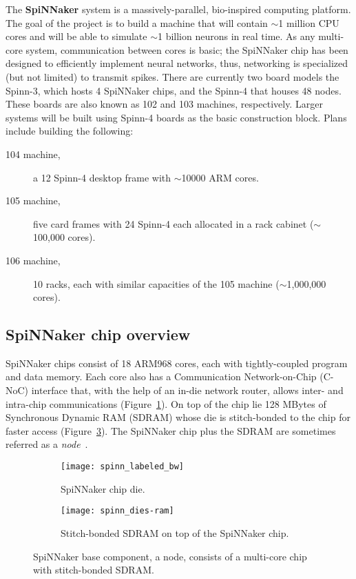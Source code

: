 The \textbf{SpiNNaker} system is a massively-parallel, bio-inspired computing platform. The goal of the project is to build a machine that will contain $\sim$1 million CPU cores and will be able to simulate $\sim$1 billion neurons in real time. As any multi-core system, communication between cores is basic; the SpiNNaker chip has been designed to efficiently implement neural networks, thus, networking is specialized (but not limited) to transmit spikes. There are currently two board models the Spinn-3, which hosts 4 SpiNNaker chips, and the Spinn-4 that houses 48 nodes. These boards are also known as 102 and 103 machines, respectively. Larger systems will be built using Spinn-4 boards as the basic construction block. Plans include building the following: 
\begin{description}
  \item[104 machine,] a 12 Spinn-4 desktop frame with $\sim$10000 ARM cores.
  \item[105 machine,] five card frames with 24 Spinn-4 each allocated in a rack cabinet ($\sim$100,000 cores).
  \item[106 machine,] 10 racks, each with similar capacities of the 105 machine ($\sim$1,000,000 cores).
\end{description}

\subsection{SpiNNaker chip overview}

SpiNNaker chips consist of 18 ARM968 cores, each with tightly-coupled program and data memory. Each core also has a Communication Network-on-Chip (C-NoC) interface that, with the help of an in-die network router, allows inter- and intra-chip communications (Figure~\ref{fig:hw:spinnaker-die}). On top of the chip lie 128 MBytes of Synchronous Dynamic RAM (SDRAM) whose die is stitch-bonded to the chip for faster access (Figure~\ref{fig:hw:bonded-sdram}). The SpiNNaker chip plus the SDRAM are sometimes referred as a \emph{node}~\cite{furber2013overview}.

\begin{figure}[h]
  \begin{center}
    \begin{subfigure}[b]{0.55\textwidth}
      \texttt{[image: spinn\_labeled\_bw]}
      \caption{SpiNNaker chip die.}
      \label{fig:hw:spinnaker-die}
    \end{subfigure}
    \hspace*{0.3cm}
    \begin{subfigure}[b]{0.4\textwidth}
      \texttt{[image: spinn\_dies-ram]}
      \caption{Stitch-bonded SDRAM on top of the SpiNNaker chip.}
      \label{fig:hw:bonded-sdram}
    \end{subfigure}
    \caption{SpiNNaker base component, a node, consists of a multi-core chip with stitch-bonded SDRAM.}
  \end{center}
\end{figure}

